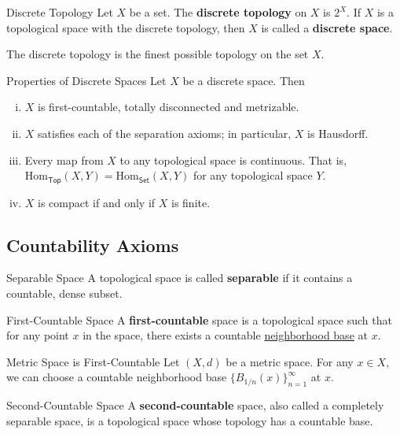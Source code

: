 \documentclass{report}
\begin{document}
\begin{definition}{Discrete Topology}{}
	Let $X$ be a set. The \textbf{discrete topology} on $X$ is $2^X$. If $X$ is a topological space with the discrete topology, then $X$ is called a \textbf{discrete space}.
\end{definition}

The discrete topology is the finest possible topology on the set $X$.

\begin{proposition}{Properties of Discrete Spaces}{}
	Let $X$ be a discrete space. Then
	\begin{enumerate}[(i)]	
		\item $X$ is first-countable, totally disconnected and metrizable.
		\item $X$ satisfies each of the separation axioms; in particular, $X$ is Hausdorff.
		\item Every map from $X$ to any topological space is continuous. That is, $\mathrm{Hom}_{\mathsf{Top}}(X,Y)=\mathrm{Hom}_{\mathsf{Set}}(X,Y)$ for any topological space $Y$.
		\item $X$ is compact if and only if $X$ is finite.
	\end{enumerate}
\end{proposition}

\subsection{Countability Axioms}

\begin{definition}{Separable Space}{}
	A topological space is called \textbf{separable} if it contains a countable, dense subset.
\end{definition}


\begin{definition}{First-Countable Space}{}
	A \textbf{first-countable} space is a topological space such that for any point $x$ in the space, there exists a countable \hyperref[th:neighborhood_base]{neighborhood base} at $x$.
\end{definition}

\begin{example}{Metric Space is First-Countable}{}
	Let $(X,d)$ be a metric space. For any $x\in X$, we can choose a countable neighborhood base $\{B_{1/n}(x)\}_{n=1}^\infty$ at $x$.
\end{example}

\begin{definition}{Second-Countable Space}{}
	A \textbf{second-countable} space, also called a completely separable space, is a topological space whose topology has a countable base.
\end{definition}
\end{document}
